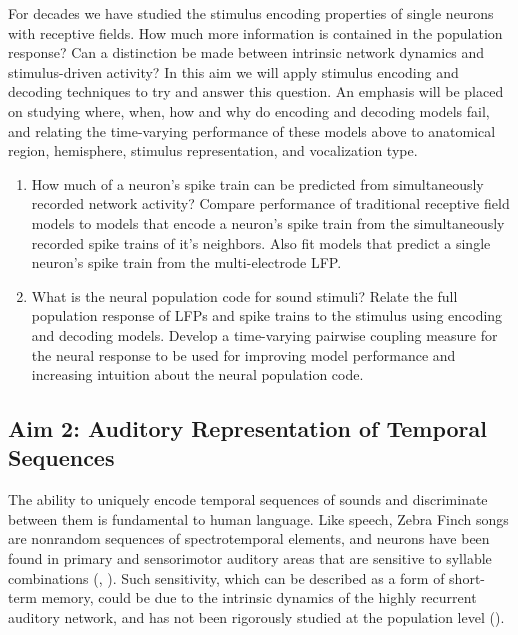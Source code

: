 \documentclass[12pt,article,oneside]{memoir}
\begin{document}
For decades we have studied the stimulus encoding properties of single neurons with receptive fields.
How much more information is contained in the population response? Can a distinction be made between
intrinsic network dynamics and stimulus-driven activity? In this aim we will apply stimulus
encoding and decoding techniques to try and answer this question. An emphasis will be placed on
studying where, when, how and why do encoding and decoding models fail, and relating the time-varying
performance of these models above to anatomical region, hemisphere, stimulus representation, and
vocalization type.

   \begin{enumerate}

   \item
   \label{aim1_single_neuron}
   How much of a neuron's spike train can be predicted from simultaneously recorded network
   activity? Compare performance of traditional receptive field models to models that encode a
   neuron's spike train from the simultaneously recorded spike trains of it's neighbors. Also fit
   models that predict a single neuron's spike train from the multi-electrode LFP.

   \item
   What is the neural population code for sound stimuli? Relate the full population response
   of LFPs and spike trains to the stimulus using encoding and decoding models. Develop a
   time-varying pairwise coupling measure for the neural response to be used for improving
   model performance and increasing intuition about the neural population code.

   \end{enumerate}

\subsection{Aim 2: Auditory Representation of Temporal Sequences}

The ability to uniquely encode temporal sequences of sounds and discriminate between them is fundamental
to human language. Like speech, Zebra Finch songs are nonrandom sequences of spectrotemporal elements,
and neurons have been found in primary and sensorimotor auditory areas that are sensitive to syllable
combinations (\cite{Margoliash1992}, \cite{Lewicki1996}). Such sensitivity, which can be described as
a form of short-term memory, could be due to the intrinsic dynamics of the highly recurrent auditory
network, and has not been rigorously studied at the population level (\cite{Buonomano2009}).
\end{document}
